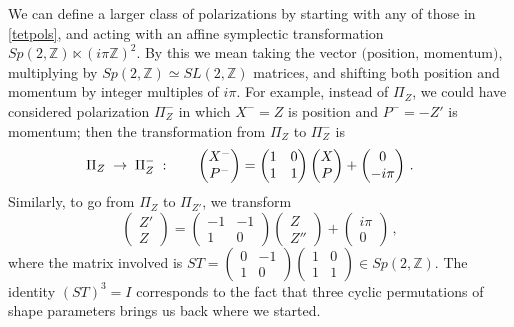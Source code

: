 \documentclass[hyper,letterpaper]{JHEP3}
\numberwithin{equation}{section}
\newcommand{\be}{\begin{equation}}
\newcommand{\ee}{\end{equation}}
\newcommand{\Z}{{\mathbb Z}}
\begin{document}
We can define a larger class of polarizations by starting with any of those in \eqref{tetpols}, and acting with an affine symplectic transformation $Sp(2,\Z)\ltimes (i\pi\Z)^2$. By this we mean taking the vector $\big(\text{position},\,\text{momentum}\big)$, multiplying by $Sp(2,\Z)\simeq SL(2,\Z)$ matrices, and shifting both position and momentum by integer multiples of $i\pi$. For example, instead of $\Pi_Z$, we could have considered polarization $\Pi^-_Z$ in which $X^-=Z$ is position and $P^-=-Z'$ is momentum; then the transformation from $\Pi_Z$ to $\Pi^-_Z$ is
%
\be \hspace{-.2in} \Pi_Z\;\to\;\Pi^-_Z\;:\qquad \begin{pmatrix} X^-\\P^- \end{pmatrix}= \begin{pmatrix}1 & 0 \\ 1 & 1 \end{pmatrix}\begin{pmatrix} X\\P \end{pmatrix} + \begin{pmatrix} 0 \\ -i\pi \end{pmatrix}\,. \label{PiZm}
\ee
%
Similarly, to go from $\Pi_Z$ to $\Pi_{Z'}$, we transform
%
\be \begin{pmatrix} Z' \\ Z \end{pmatrix} = \begin{pmatrix} -1 & -1 \\ 1 & 0 \end{pmatrix}\begin{pmatrix} Z \\ Z'' \end{pmatrix} + \begin{pmatrix}i\pi \\ 0\end{pmatrix}\,,\ee
%
where the matrix involved is $ST = \left(\begin{smallmatrix} 0 & -1 \\ 1 & 0\end{smallmatrix}\right)\left(\begin{smallmatrix} 1&0\\1&1 \end{smallmatrix}\right)\in Sp(2,\Z)$. The identity $(ST)^3=I$ corresponds to the fact that three cyclic permutations of shape parameters brings us back where we started.
\end{document}
